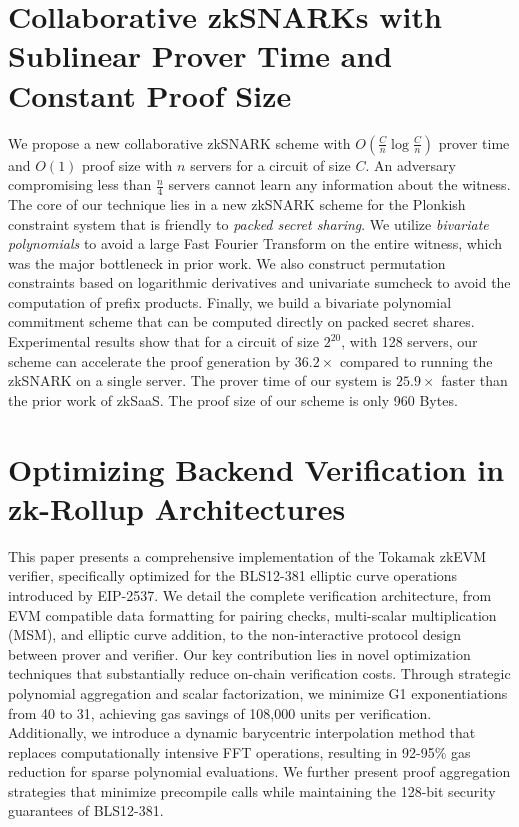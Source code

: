 \documentclass[11pt,oneside]{book}
\theoremstyle{definition}
\theoremstyle{remark}
\theoremstyle{plain}
\begin{document}
\section{\cite{cryptoeprint:2025/1388} Collaborative zkSNARKs with Sublinear Prover Time and Constant Proof Size}
We propose a new collaborative zkSNARK scheme with $O\left(\frac{C}{n} \log \frac{C}{n}\right)$ prover time and $O(1)$ proof size with $n$ servers for a circuit of size $C$. 
An adversary compromising less than $\frac{n}{4}$ servers cannot learn any information about the witness. 
The core of our technique lies in a new zkSNARK scheme for the Plonkish constraint system that is friendly to \emph{packed secret sharing}. We utilize \emph{bivariate polynomials} to avoid a large Fast Fourier Transform on the entire witness, which was the major bottleneck in prior work. We also construct permutation constraints based on logarithmic derivatives and univariate sumcheck to avoid the computation of prefix products. Finally, we build a bivariate polynomial commitment scheme that can be computed directly on packed secret shares.
Experimental results show that for a circuit of size $2^{20}$, with 128 servers, our scheme can accelerate the proof generation by $36.2 \times$ compared to running the zkSNARK on a single server. The prover time of our system is $25.9 \times$ faster than the prior work of zkSaaS. The proof size of our scheme is only 960 Bytes.

\section{\cite{cryptoeprint:2025/1390} Optimizing Backend Verification in zk-Rollup Architectures}
This paper presents a comprehensive implementation of the Tokamak zkEVM verifier, specifically optimized for the BLS12-381 elliptic curve operations introduced by EIP-2537. We detail the complete verification architecture, from EVM compatible data formatting for pairing checks, multi-scalar multiplication (MSM), and elliptic curve addition, to the non-interactive protocol design between prover and verifier.
Our key contribution lies in novel optimization techniques that substantially reduce on-chain verification costs. 
Through strategic polynomial aggregation and scalar factorization, we minimize G1 exponentiations from 40 to 31, achieving gas savings of 108,000 units per verification. 
Additionally, we introduce a dynamic barycentric interpolation method that replaces computationally intensive FFT operations,
resulting in 92-95\% gas reduction for sparse polynomial evaluations. We further present proof aggregation strategies that minimize precompile calls while maintaining the 128-bit security guarantees of BLS12-381.
\end{document}
